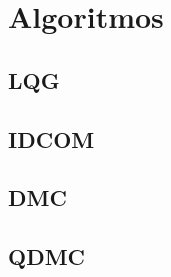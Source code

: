 \section{Algoritmos}
\label{sec:algoritmos}


\subsection{LQG}
\label{subsec:lqg}


\subsection{IDCOM}
\label{subsec:idcom}


\subsection{DMC}
\label{subsec:dmc}


\subsection{QDMC}
\label{subsec:qdmc}


